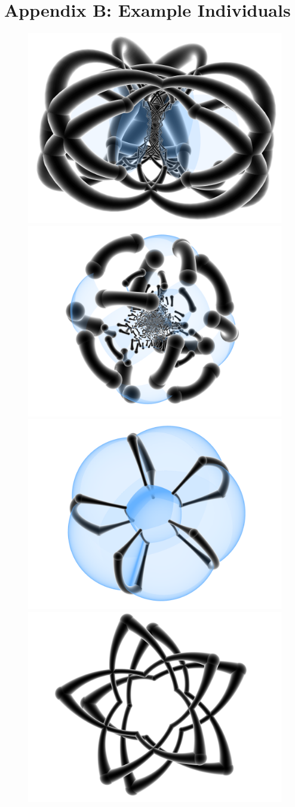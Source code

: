 \documentclass{article}
\begin{document}
\section*{Appendix B: Example Individuals}
\vspace{-2mm}
\begin{figure}[h!!t]
	\begin{center}
		\includegraphics[width = .45\textwidth]{../Examples/0x9134db20eb2d6f07.png}
		\includegraphics[width = .45\textwidth]{../Examples/0x53090ffede18f1b8.png}\\
		\vspace{2mm}
		\includegraphics[width = .45\textwidth]{../Examples/0xc3298ff8d8003028.png}
		\includegraphics[width = .45\textwidth]{../Examples/0xc3090fe89c10f098.png}\\

\end{center}
\end{figure}
\end{document}
